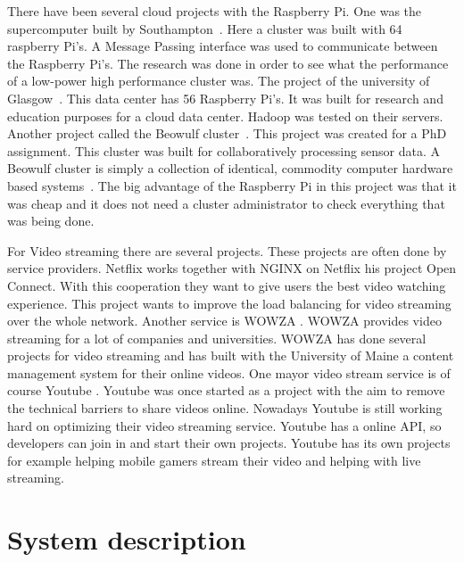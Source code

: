 \documentclass{sig-alternate-br}
\begin{document}
There have been several cloud projects with the Raspberry Pi. \newline
One was the supercomputer built by Southampton~\cite{cox:2014}. Here a cluster was built with 64 raspberry Pi's. A Message Passing interface was used to communicate between the Raspberry Pi's. The research was done in order to see what the performance of a low-power high performance cluster was. \newline
The project of the university of Glasgow~\cite{tso:2013}. This data center has 56 Raspberry Pi's. It was built for research and education purposes for a cloud data center. Hadoop was tested on their servers. \newline
Another project called the Beowulf cluster~\cite{beowolf-setup}. This project was created for a PhD assignment. This cluster was built for collaboratively processing sensor data.  A Beowulf cluster is simply a collection of identical, commodity computer hardware based systems~\cite{beowolf-setup}. The big advantage of the Raspberry Pi in this project was that it was cheap and it does not need a cluster administrator to check everything that was being done. 

For Video streaming there are several projects. These projects are often done by service providers. \newline
Netflix works together with NGINX on Netflix his project Open Connect. With this cooperation they want to give  users the best video watching experience. This project wants to improve the load balancing for video streaming over the whole network. \newline
Another service is WOWZA \cite{wowza}. WOWZA provides video streaming for a lot of companies and universities. WOWZA has done several projects for video streaming and has built with the University of Maine a content management system for their online videos. \newline 
One mayor video stream service is of course Youtube \cite{youtube}. Youtube was once started as a project with the aim to remove the technical barriers to share videos online. Nowadays Youtube is still working hard on optimizing their video streaming service. Youtube has a online API, so developers can join in and start their own projects. Youtube has its own projects for example helping mobile gamers stream their video and helping with live streaming.

\section{System description}\label{sec:system}
\end{document}

